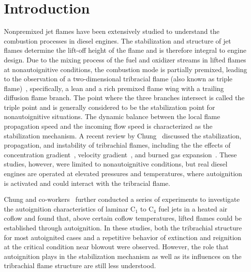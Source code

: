 \documentclass[review,3p,times]{elsarticle}
\begin{document}
\section{Introduction}

Nonpremixed jet flames have been extensively studied to understand the combustion processes in diesel engines.  The stabilization and structure of jet flames determine the lift-off height of the flame and is therefore integral to engine design.  Due to the mixing process of the fuel and oxidizer streams in lifted flames at nonautoignitive conditions, the combustion mode is partially premixed, leading to the observation of a two-dimensional tribracial flame (also known as triple flame)~\cite{buckmaster02}, specifically, a lean and a rich premixed flame wing with a trailing diffusion flame branch.  The point where the three branches intersect is called the triple point and is generally considered to be the stabilization point for nonautoignitive situations. The dynamic balance between the local flame propagation speed and the incoming flow speed is characterized as the stabilization mechanism.  A recent review by Chung~\cite{chung07} discussed the stabilization, propagation, and instability of tribrachial flames, including the the effects of concentration gradient~\cite{dold89,hartley91,ghosal00}, velocity gradient~\cite{kim07}, and burned gas expansion~\cite{ruetsch95,lee97,plessing98,kioni99}.  These studies, however, were limited to nonautoignitive conditions, but real diesel engines are operated at elevated pressures and temperatures, where autoignition is activated and could interact with the tribracial flame. 

Chung and co-workers~\cite{choi09,choi10,choi12} further conducted a series of experiments to investigate the autoignition characteristics of laminar C$_1$ to C$_4$ fuel jets in a heated air coflow and found that, above certain coflow temperatures, lifted flames could be established through autoignition.  In these studies, both the tribrachial structure for most autoignited cases and a repetitive behavior of extinction and reignition at the critical condition near blowout were observed.  However, the role that autoignition plays in the stabilization mechanism as well as its influences on the tribrachial flame structure are still less understood.  
\end{document}
